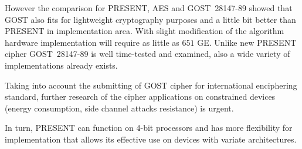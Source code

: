 However the comparison for PRESENT, AES and GOST~28147-89
showed that GOST also fits for lightweight cryptography purposes and
a little bit better than PRESENT in implementation area. With slight
modification of the algorithm hardware implementation will require as little as
$ 651 $ GE. Unlike new PRESENT cipher GOST~28147-89 is well
time-tested and examined, also a wide variety of implementations already exists.

Taking into account the submitting of GOST cipher for international
enciphering standard, further research of the cipher applications on constrained
devices (energy consumption, side channel attacks resistance) is urgent. 

In turn, PRESENT can function on 4-bit processors and has more flexibility
for implementation that allows its effective use on devices with variate
architectures.


